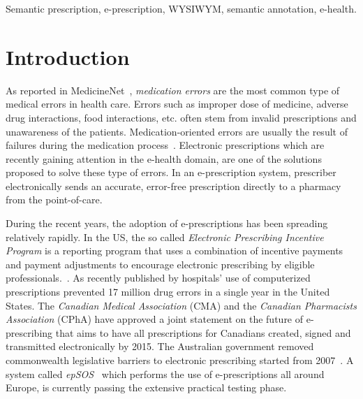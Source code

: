 \documentclass[journal]{IEEEtran}
\begin{document}
\begin{IEEEkeywords}
 Semantic prescription, e-prescription, WYSIWYM, semantic annotation, e-health.
\end{IEEEkeywords}



\IEEEpeerreviewmaketitle


\section{Introduction}
\label{intro}

As reported in MedicineNet~\cite{medicationErrors}, \emph{medication errors} are the most common type of medical errors in health care.
Errors such as improper dose of medicine, adverse drug interactions, food interactions, etc. often stem from invalid prescriptions and unawareness of the patients.
Medication-oriented errors are usually the result of failures during the medication process~\cite{SemMed}.
Electronic prescriptions which are recently gaining attention in the e-health domain, are one of the solutions proposed to solve these type of errors.
In an e-prescription system, prescriber electronically sends an accurate, error-free prescription directly to a pharmacy from the point-of-care.

During the recent years, the adoption of e-prescriptions has been spreading relatively rapidly.
In the US, the so called \emph{Electronic Prescribing Incentive Program} is a reporting program that uses a combination of incentive payments and payment adjustments to encourage electronic prescribing by eligible professionals.~\cite{epincentive}.
As recently published by \cite{eprescStat2013} hospitals' use of computerized prescriptions prevented 17 million drug errors in a single year in the United States.
The \emph{Canadian Medical Association} (CMA) and the \emph{Canadian Pharmacists Association} (CPhA) have approved a joint statement on the future of e-prescribing that aims to have all prescriptions for Canadians created, signed and transmitted electronically by 2015.
The Australian government removed commonwealth legislative barriers to electronic prescribing started from 2007~\cite{medicare}.
A system called \emph{epSOS}~\cite{epsos} which performs the use of e-prescriptions all around Europe, is currently passing the extensive practical testing phase.
\end{document}
